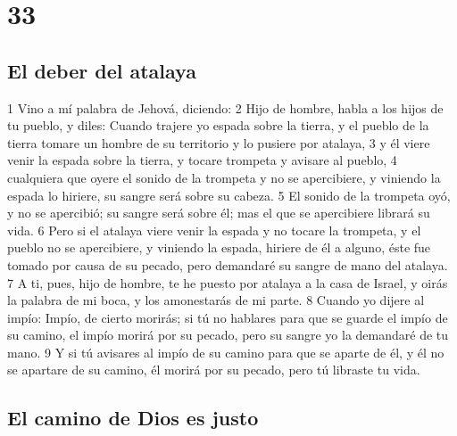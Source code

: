\chapter{33}

\section*{El deber del atalaya }

1 Vino a mí palabra de Jehová, diciendo:
2 Hijo de hombre, habla a los hijos de tu pueblo, y diles: Cuando trajere yo espada sobre la tierra, y el pueblo de la tierra tomare un hombre de su territorio y lo pusiere por atalaya,
3 y él viere venir la espada sobre la tierra, y tocare trompeta y avisare al pueblo,
4 cualquiera que oyere el sonido de la trompeta y no se apercibiere, y viniendo la espada lo hiriere, su sangre será sobre su cabeza.
5 El sonido de la trompeta oyó, y no se apercibió; su sangre será sobre él; mas el que se apercibiere librará su vida.
6 Pero si el atalaya viere venir la espada y no tocare la trompeta, y el pueblo no se apercibiere, y viniendo la espada, hiriere de él a alguno, éste fue tomado por causa de su pecado, pero demandaré su sangre de mano del atalaya.
7 A ti, pues, hijo de hombre, te he puesto por atalaya a la casa de Israel, y oirás la palabra de mi boca, y los amonestarás de mi parte.
8 Cuando yo dijere al impío: Impío, de cierto morirás; si tú no hablares para que se guarde el impío de su camino, el impío morirá por su pecado, pero su sangre yo la demandaré de tu mano.
9 Y si tú avisares al impío de su camino para que se aparte de él, y él no se apartare de su camino, él morirá por su pecado, pero tú libraste tu vida.

\section*{El camino de Dios es justo}

